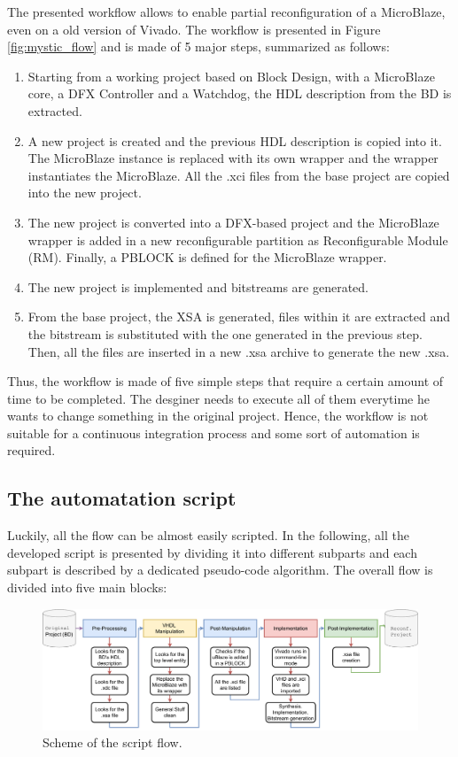 The presented workflow allows to enable partial reconfiguration of a MicroBlaze, even on a old version of Vivado. The workflow is presented in Figure \ref{fig:mystic_flow} and is made of 5 major steps, summarized as follows:

\begin{enumerate}
    \item Starting from a working project based on Block Design, with a MicroBlaze core, a DFX Controller and a Watchdog, the HDL description from the BD is extracted.
    \item A new project is created and the previous HDL description is copied into it. The MicroBlaze instance is replaced with its own wrapper and the wrapper instantiates the MicroBlaze. All the .xci files from the base project are copied into the new project.
    \item The new project is converted into a DFX-based project and the MicroBlaze wrapper is added in a new reconfigurable partition as Reconfigurable Module (RM). Finally, a PBLOCK is defined for the MicroBlaze wrapper.
    \item The new project is implemented and bitstreams are generated.
    \item From the base project, the XSA is generated, files within it are extracted and the bitstream is substituted with the one generated in the previous step. Then, all the files are inserted in a new .xsa archive to generate the new .xsa.
\end{enumerate}

Thus, the workflow is made of five simple steps that require a certain amount of time to be completed. The desginer needs to execute all of them everytime he wants to change something in the original project. Hence, the workflow is not suitable for a continuous integration process and some sort of automation is required. \bigskip

\subsection{The automatation script}

Luckily, all the flow can be almost easily scripted. In the following, all the developed script is presented by dividing it into different subparts and each subpart is described by a dedicated pseudo-code algorithm. The overall flow is divided into five main blocks:

\begin{figure}[H]
\centering
\includegraphics[width=0.95\linewidth]{images/chapter4/script_flow2.pdf}
\caption{Scheme of the script flow.}
\end{figure}

